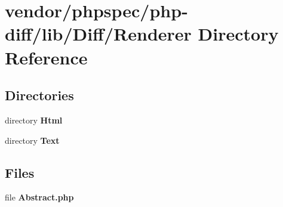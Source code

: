 \section{vendor/phpspec/php-\/diff/lib/\+Diff/\+Renderer Directory Reference}
\label{dir_3038082122d8c187ec098b667004c3f7}
\subsection*{Directories}
\begin{DoxyCompactItemize}
\item 
directory {\bf Html}
\item 
directory {\bf Text}
\end{DoxyCompactItemize}
\subsection*{Files}
\begin{DoxyCompactItemize}
\item 
file {\bf Abstract.\+php}
\end{DoxyCompactItemize}
